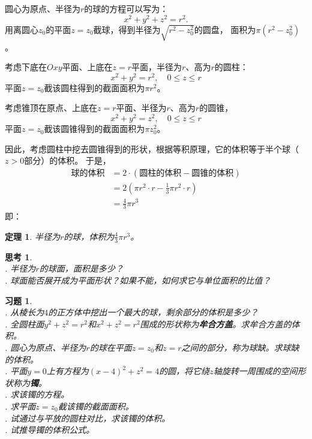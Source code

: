 \documentclass[12pt,UTF8]{ctexbook}
\newtheorem{tm}{定理}[section]
\newtheorem{sk}{思考}[section]
\newtheorem{xt}{习题}[section]
\begin{document}
圆心为原点、半径为$r$的球的方程可以写为：
$$ x^2 + y^2 + z^2 = r^2.$$
用离圆心$z_0$的平面$z = z_0$截球，得到半径为$\sqrt{r^2 - z_0^2}$的圆盘，
面积为$\pi(r^2 - z_0^2)$。

考虑下底在$Oxy$平面、上底在$z=r$平面，半径为$r$、高为$r$的圆柱：
$$ x^2 + y^2 = r^2, \quad 0\leqslant z \leqslant r $$
平面$z = z_0$截该圆柱得到的截面面积为$\pi r^2$。

考虑锥顶在原点、上底在$z=r$平面、半径为$r$、高为$r$的圆锥，
$$ x^2 + y^2 = z^2, \quad 0\leqslant z \leqslant r $$
平面$z = z_0$截该圆锥得到的截面面积为$\pi z_0^2$。

因此，考虑圆柱中挖去圆锥得到的形状，根据等积原理，它的体积等于半个球（$z>0$部分）的体积。
于是，
\begin{align*}
    \text{球的体积} &= 2\cdot\left(\text{圆柱的体积} - \text{圆锥的体积}\right)  \\
    &= 2\left(\pi r^2\cdot r - \frac{1}{3}\pi r^2\cdot r \right) \\
    &= \frac{4}{3}\pi r^3 
\end{align*}
即：
\begin{tm}\label{tm:3-3-30}
    半径为$r$的球，体积为$\frac{4}{3}\pi r^3$。
\end{tm}

\begin{sk}
    \mbox{}\\
    . 半径为$r$的球面，面积是多少？\\
    . 球面能否展开成为平面形状？如果不能，如何求它与单位面积的比值？
\end{sk}

\begin{xt}
    \mbox{}\\
    . 从棱长为$4$的正方体中挖出一个最大的球，剩余部分的体积是多少？\\
    . 全圆柱面$y^2+z^2=r^2$和$x^2+z^2=r^2$围成的形状称为\textbf{牟合方盖}。求牟合方盖的体积。\\
    . 圆心为原点、半径为$r$的球在平面$z = z_0$和$z = r$之间的部分，称为球缺。求球缺的体积。 \\
    . 平面$y = 0$上有方程为$(x - 4)^2 + z^2 = 4$的圆，将它绕$z$轴旋转一周围成的空间形状称为\textbf{镯}。\\
    . 求该镯的方程。\\
    . 求平面$z = z_0$截该镯的截面面积。\\ 
    . 试通过与平放的圆柱对比，求该镯的体积。\\
    . 试推导镯的体积公式。
\end{xt}
\end{document}
